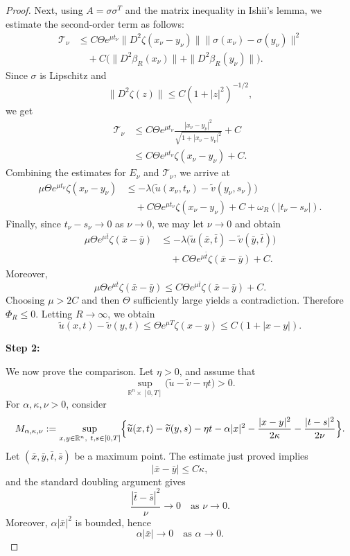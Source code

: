 \documentclass[preprint]{elsarticle}
\numberwithin{equation}{section}
\begin{document}
\begin{proof}
Next, using \(A=\sigma\sigma^T\) and the matrix inequality in Ishii's lemma, we estimate the second-order term as follows:
\[
\begin{aligned}
 \mathcal T_\nu
 &\le
 C\Theta e^{\mu t_\nu}
 \|D^2\zeta(x_\nu-y_\nu)\|
 \|\sigma(x_\nu)-\sigma(y_\nu)\|^2
 \\
 &\quad+
 C\bigl(
 \|D^2\beta_R(x_\nu)\|
 +
 \|D^2\beta_R(y_\nu)\|
 \bigr).
\end{aligned}
\]
Since \(\sigma\) is Lipschitz and
\[
 \|D^2\zeta(z)\|\le C(1+|z|^2)^{-1/2},
\]
we get
\[
\begin{aligned}
 \mathcal T_\nu
 &\le
 C\Theta e^{\mu t_\nu}
 \frac{|x_\nu-y_\nu|^2}{\sqrt{1+|x_\nu-y_\nu|^2}}
 +
 C
 \\
 &\le
 C\Theta e^{\mu t_\nu}\zeta(x_\nu-y_\nu)+C.
\end{aligned}
\]
Combining the estimates for \(E_\nu\) and \(\mathcal T_\nu\), we arrive at
\[
\begin{aligned}
 \mu\Theta e^{\mu t_\nu}\zeta(x_\nu-y_\nu)
 &\le
 -\lambda\bigl(
 \widetilde u(x_\nu,t_\nu)-\widetilde v(y_\nu,s_\nu)
 \bigr)
 \\
 &\quad+
 C\Theta e^{\mu t_\nu}\zeta(x_\nu-y_\nu)
 +
 C
 +
 \omega_R(|t_\nu-s_\nu|).
\end{aligned}
\]
Finally, since \(t_\nu-s_\nu\to0\) as \(\nu\to0\), we may let \(\nu\to0\) and obtain
\[
\begin{aligned}
 \mu\Theta e^{\mu \bar t}\zeta(\bar x-\bar y)
 &\le
 -\lambda\bigl(
 \widetilde u(\bar x,\bar t)-\widetilde v(\bar y,\bar t)
 \bigr)
 \\
 &\quad+
 C\Theta e^{\mu \bar t}\zeta(\bar x-\bar y)
 +
 C.
\end{aligned}
\]
Moreover,
\[
 \mu\Theta e^{\mu\bar t}\zeta(\bar x-\bar y)
 \le
 C\Theta e^{\mu\bar t}\zeta(\bar x-\bar y)+C.
\]
Choosing \(\mu>2C\) and then \(\Theta\) sufficiently large yields a contradiction. Therefore $\Phi_R\le0.$
Letting \(R\to\infty\), we obtain
\[
 \widetilde u(x,t)-\widetilde v(y,t)
 \le
 \Theta e^{\mu T}\zeta(x-y)
 \le
 C(1+|x-y|).
\]

\textbf{Step 2:}

We now prove the comparison. Let \(\eta>0\), and assume that
\[
 \sup_{\mathbb R^n\times[0,T]}
 \bigl(\widetilde u-\widetilde v-\eta t\bigr)>0.
\]
For \(\alpha,\kappa,\nu>0\), consider
\[
\begin{aligned}
 M_{\alpha,\kappa,\nu}
 :=
 \sup_{x,y\in\mathbb R^n,\ t,s\in[0,T]}
 \Bigl\{
 \widetilde u(x,t)-\widetilde v(y,s)
 -
 \eta t
 -
 \alpha|x|^2
 -
 \frac{|x-y|^2}{2\kappa}
 -
 \frac{|t-s|^2}{2\nu}
 \Bigr\}.
\end{aligned}
\]
Let \((\bar x,\bar y,\bar t,\bar s)\) be a maximum point. The estimate just proved implies
\[
 |\bar x-\bar y|\le C\kappa,
\]
and the standard doubling argument gives
\[
 \frac{|\bar t-\bar s|^2}{\nu}\to0
 \quad\text{as }\nu\to0.
\]
Moreover, $ \alpha|\bar x|^2$
is bounded, hence
\[
 \alpha|\bar x|\to0
 \quad\text{as }\alpha\to0.
\]


\end{proof}
\end{document}
